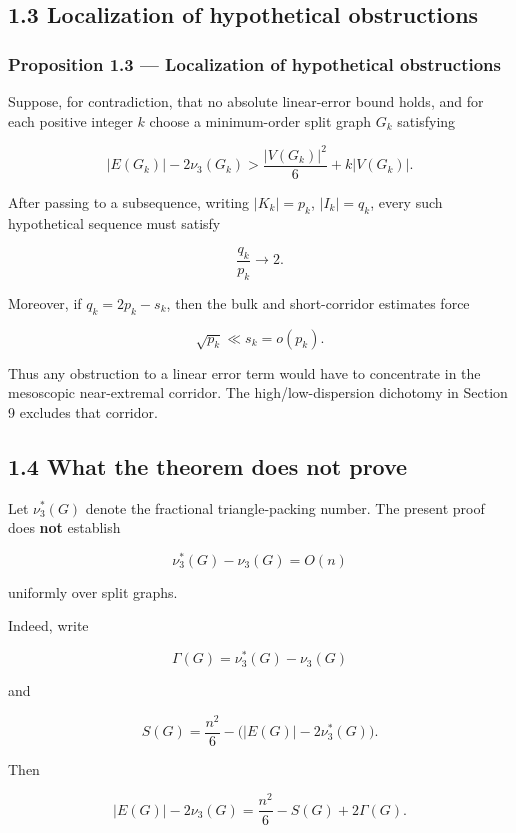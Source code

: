 \documentclass[
  11pt,
]{article}
\begin{document}
\subsection{1.3 Localization of hypothetical obstructions}\label{localization-of-hypothetical-obstructions}

\subsubsection{Proposition 1.3 --- Localization of hypothetical obstructions}\label{proposition-1.3-localization-of-hypothetical-obstructions}

Suppose, for contradiction, that no absolute linear-error bound holds, and for each positive integer \(k\) choose a minimum-order split graph \(G_k\) satisfying

\[
|E(G_k)|-2\nu_3(G_k)>\frac{|V(G_k)|^2}{6}+k|V(G_k)|.
\]

After passing to a subsequence, writing \(|K_k|=p_k\), \(|I_k|=q_k\), every such hypothetical sequence must satisfy

\[
\frac{q_k}{p_k}\longrightarrow 2.
\]

Moreover, if \(q_k=2p_k-s_k\), then the bulk and short-corridor estimates force

\[
\sqrt{p_k}\ll s_k=o(p_k).
\]

Thus any obstruction to a linear error term would have to concentrate in the mesoscopic near-extremal corridor. The high/low-dispersion dichotomy in Section 9 excludes that corridor.

\subsection{1.4 What the theorem does not prove}\label{what-the-theorem-does-not-prove}

Let \(\nu_3^*(G)\) denote the fractional triangle-packing number. The present proof does \textbf{not} establish

\[
\nu_3^*(G)-\nu_3(G)=O(n)
\tag{1.4}
\]

uniformly over split graphs.

Indeed, write

\[
\Gamma(G)=\nu_3^*(G)-\nu_3(G)
\]

and

\[
S(G)=\frac{n^2}{6}-\bigl(|E(G)|-2\nu_3^*(G)\bigr).
\]

Then

\[
|E(G)|-2\nu_3(G)
=
\frac{n^2}{6}-S(G)+2\Gamma(G).
\tag{1.5}
\]
\end{document}

